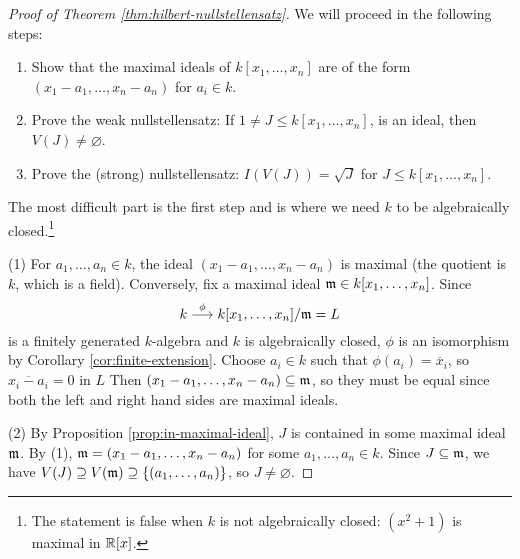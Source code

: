 \begin{proof}[Proof of Theorem \ref{thm:hilbert-nullstellensatz}]
  We will proceed in the following
  steps:
  \begin{enumerate}
    \item Show that the maximal ideals
      of $k[x_1, \dots, x_n]$ are
      of the form $(x_1 - a_1, \dots, x_n - a_n)$
      for $a_i \in k$.
    \item Prove the weak nullstellensatz:
      If $1 \ne J \le k[x_1, \dots, x_n]$,
      is an ideal, then $V(J) \ne \varnothing$.
    \item Prove the (strong) nullstellensatz:
      $I(V(J)) = \sqrt{J}$
      for $J \le k[x_1, \dots, x_n]$.
  \end{enumerate}
  The most difficult part is the first step
  and is where we need $k$ to be
  algebraically closed.\footnote{The statement is false when $k$ is not algebraically closed: $(x^2 + 1)$ is maximal in $\mathbb{R}[x]$.}

  (1) For $a_1, \dots, a_n \in k$, the
  ideal $(x_1 - a_1, \dots, x_n - a_n)$
  is maximal (the quotient is $k$, which
  is a field). Conversely, fix a maximal
  ideal $\mathfrak{m} \in k[x_1, \dots, x_n]$.
  Since
  \[
    k \overset{\phi}{\longrightarrow}
    k[x_1, \dots, x_n] / \mathfrak{m} = L
  \]
  is a finitely generated $k$-algebra and
  $k$ is algebraically closed,
  $\phi$ is an isomorphism by
  Corollary \ref{cor:finite-extension}.
  Choose $a_i \in k$ such that
  $\phi(a_i) = \overline{x}_i$, so
  $\overline{x_i - a_i} = 0$ in $L$
  Then $(x_1 - a_1, \dots, x_n - a_n) \subseteq \mathfrak{m}$, so they
  must be equal since both the left and
  right hand sides are maximal ideals.

  (2) By Proposition \ref{prop:in-maximal-ideal},
  $J$ is contained in some maximal ideal
  $\mathfrak{m}$. By (1), $\mathfrak{m} = (x_1 - a_1, \dots, x_n - a_n)$
  for some $a_1, \dots, a_n \in k$.
  Since $J \subseteq \mathfrak{m}$, we have
  $V(J) \supseteq V(\mathfrak{m}) \supseteq \{(a_1, \dots, a_n)\}$, so
  $J \ne \varnothing$.


\end{proof}
